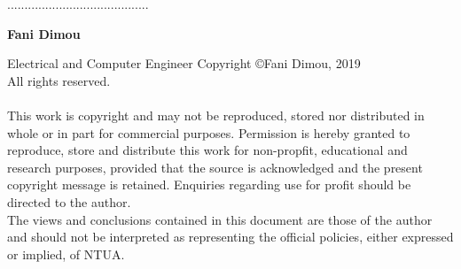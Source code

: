 \thispagestyle{empty}
.........................................

\textbf{Fani Dimou}

Electrical and Computer Engineer
\hfill\break
\vspace*{\fill}
\hfill\break
Copyright \copyright Fani Dimou, 2019\\
All rights reserved.\\[12pt]\\
\hfill\break
This work is copyright and may not be reproduced, stored nor distributed in whole or in part for commercial purposes. Permission is hereby granted to reproduce, store and distribute this work for non-propfit, educational and research purposes, provided that the source is acknowledged and the present copyright message is retained. Enquiries regarding use for profit should be directed to the author. \\
\hfill\break
The views and conclusions contained in this document are those of the author and should not be interpreted as representing the official policies, either expressed or implied, of NTUA.
\vspace*{2cm}
